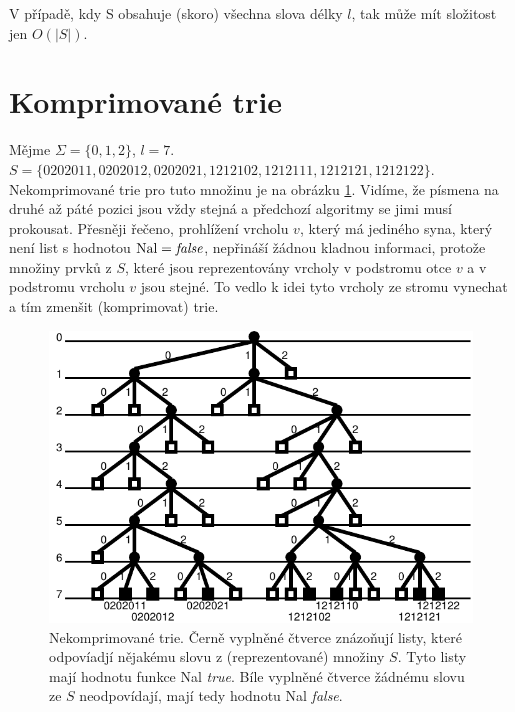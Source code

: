 \begin{pozn}
V případě, kdy S obsahuje (skoro) všechna slova délky $l$, tak může
mít složitost jen $O(|S|)$.
\end{pozn}

\section{Komprimované trie}

Mějme $\Sigma = \{0,1,2\}$, $l=7$.
$S = \{0202011, 0202012, 0202021, 1212102, 1212111, 1212121, 1212122\}$.
Nekomprimované trie pro tuto množinu je na obrázku \ref{fig:tries}.
Vidíme, že písmena na druhé až páté pozici jsou vždy stejná a
předchozí algoritmy se jimi musí prokousat. Přesněji 
řečeno, prohlížení vrcholu $v$, který má jediného 
syna, který není list s hodnotou $\textrm{Nal} = \textit{false}$, nepřináší 
žádnou kladnou informaci, protože množiny prvků z $S$, 
které jsou reprezentovány vrcholy v podstromu otce $v$ a v podstromu 
vrcholu $v$ jsou stejné. To vedlo k idei tyto vrcholy ze stromu vynechat a
tím zmenšit (komprimovat) trie.  

\begin{figure}
\centering\includegraphics{pics/tries}
\caption{Nekomprimované trie. Černě vyplněné čtverce znázoňují listy,
které odpovíadjí nějakému slovu z (reprezentované) množiny $S$. Tyto listy
mají hodnotu funkce Nal \textit{true}. Bíle vyplněné čtverce žádnému slovu
ze $S$ neodpovídají, mají tedy hodnotu Nal \textit{false}.}
\label{fig:tries}
\end{figure}

